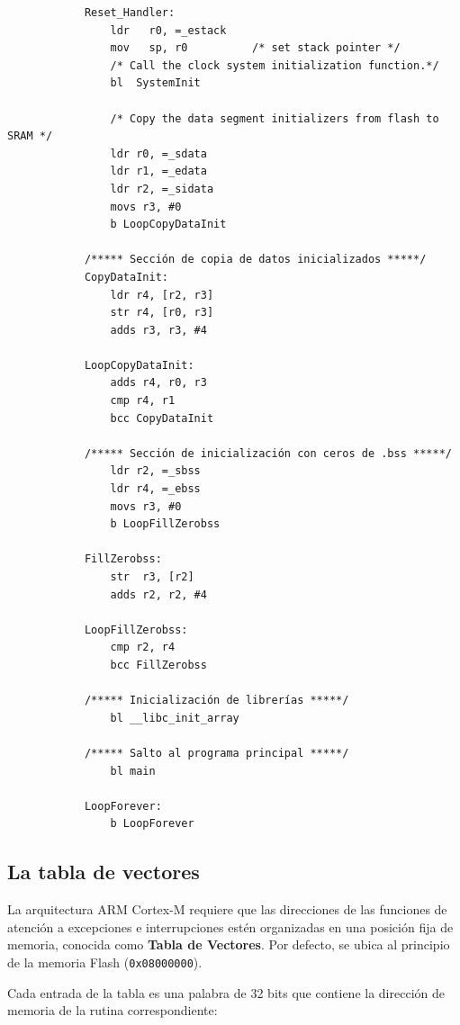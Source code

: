 \documentclass[../main.tex]{subfiles}
\begin{document}
        \begin{lstlisting}
            Reset_Handler:
                ldr   r0, =_estack
                mov   sp, r0          /* set stack pointer */
                /* Call the clock system initialization function.*/
                bl  SystemInit

                /* Copy the data segment initializers from flash to SRAM */
                ldr r0, =_sdata
                ldr r1, =_edata
                ldr r2, =_sidata
                movs r3, #0
                b LoopCopyDataInit

            /***** Sección de copia de datos inicializados *****/
            CopyDataInit:
                ldr r4, [r2, r3]
                str r4, [r0, r3]
                adds r3, r3, #4

            LoopCopyDataInit:
                adds r4, r0, r3
                cmp r4, r1
                bcc CopyDataInit

            /***** Sección de inicialización con ceros de .bss *****/
                ldr r2, =_sbss
                ldr r4, =_ebss
                movs r3, #0
                b LoopFillZerobss

            FillZerobss:
                str  r3, [r2]
                adds r2, r2, #4

            LoopFillZerobss:
                cmp r2, r4
                bcc FillZerobss

            /***** Inicialización de librerías *****/
                bl __libc_init_array
            
            /***** Salto al programa principal *****/
                bl main

            LoopForever:
                b LoopForever
        \end{lstlisting}

    \subsection{La tabla de vectores}

        La arquitectura ARM Cortex-M requiere que las direcciones de las funciones de atención a excepciones e interrupciones estén organizadas en una posición fija de memoria, conocida como \textbf{Tabla de Vectores}. Por defecto, se ubica al principio de la memoria Flash (\texttt{0x08000000}).

        Cada entrada de la tabla es una palabra de 32 bits que contiene la dirección de memoria de la rutina correspondiente:
\end{document}

